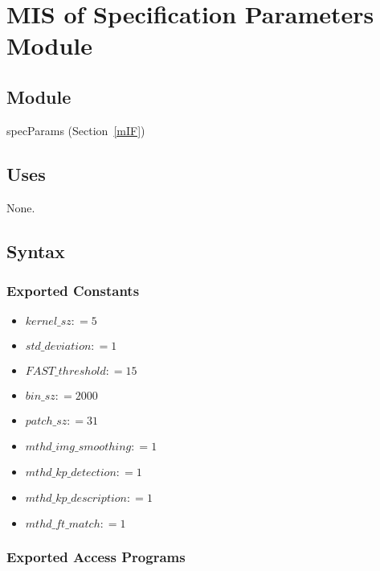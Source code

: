 \documentclass[12pt, titlepage]{article}
\begin{document}

  \section{MIS of Specification Parameters Module} \label{mSP}



\subsection{Module}
specParams (Section~\ref{mIF})

\subsection{Uses}
None.

\subsection{Syntax}

\subsubsection{Exported Constants}
\begin{itemize}
  \item $kernel\_sz: = 5$
  \item $std\_deviation: = 1$ 
  \item $FAST\_threshold: = 15$ 
  \item $bin\_sz: = 2000$ 
  \item $patch\_sz: = 31$ 
  \item $mthd\_img\_smoothing: = 1$
  \item $mthd\_kp\_detection: = 1$ 
  \item $mthd\_kp\_description: = 1$
  \item $mthd\_ft\_match: = 1$
\end{itemize}
\subsubsection{Exported Access Programs}
\end{document}
